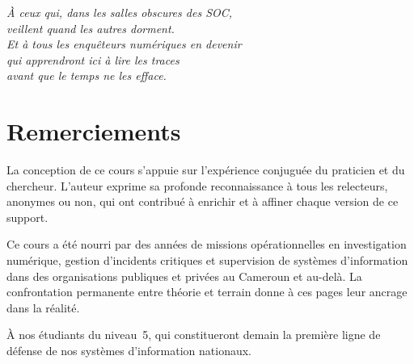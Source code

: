 \documentclass[12pt, a4paper, twoside, openright]{book}
\begin{document}
\clearpage
\thispagestyle{empty}
\vspace*{3cm}
\begin{flushright}
    \begin{minipage}{0.62\textwidth}
        \itshape\large\color{CouleurPrimaire}
        À ceux qui, dans les salles obscures des SOC,\\
        veillent quand les autres dorment.\\[1.5ex]
        \normalsize\normalfont\color{CouleurAccent}
        Et à tous les enquêteurs numériques en devenir\\
        qui apprendront ici à lire les traces\\
        avant que le temps ne les efface.
    \end{minipage}
\end{flushright}


\clearpage
\thispagestyle{empty}
\chapter*{Remerciements}

La conception de ce cours s'appuie sur l'expérience conjuguée du praticien
et du chercheur. L'auteur exprime sa profonde reconnaissance à tous les
relecteurs, anonymes ou non, qui ont contribué à enrichir et à affiner
chaque version de ce support.

Ce cours a été nourri par des années de missions opérationnelles en
investigation numérique, gestion d'incidents critiques et supervision
de systèmes d'information dans des organisations publiques et privées
au Cameroun et au-delà. La confrontation permanente entre théorie
et terrain donne à ces pages leur ancrage dans la réalité.

À nos étudiants du niveau~5, qui constitueront demain la première
ligne de défense de nos systèmes d'information nationaux.


\clearpage
\thispagestyle{empty}
\end{document}
